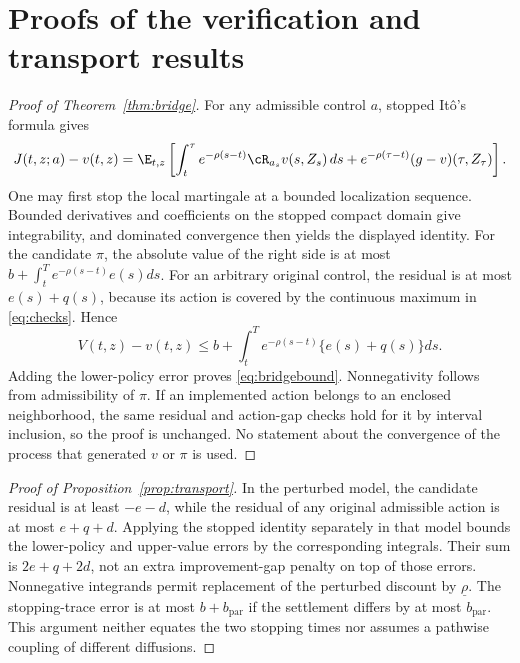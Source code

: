 \section{Proofs of the verification and transport results}\label{app:bridge}
\begin{proof}[Proof of Theorem~\ref{thm:bridge}]
For any admissible control $a$, stopped It\^o's formula gives
\begin{align*}
 J(t,z;a)-v(t,z)
 =\E_{t,z}\left[\int_t^\tau e^{-\rho(s-t)}\cR_{a_s}v(s,Z_s)\,ds
       +e^{-\rho(\tau-t)}(g-v)(\tau,Z_\tau)\right].
\end{align*}
One may first stop the local martingale at a bounded localization sequence. Bounded derivatives and coefficients on the stopped compact domain give integrability, and dominated convergence then yields the displayed identity. For the candidate $\pi$, the absolute value of the right side is at most
$b+\int_t^T e^{-\rho(s-t)}e(s)ds$.
For an arbitrary original control, the residual is at most $e(s)+q(s)$, because its action is covered by the continuous maximum in \eqref{eq:checks}. Hence
\[
 V(t,z)-v(t,z)\leq b+\int_t^T e^{-\rho(s-t)}\{e(s)+q(s)\}ds.
\]
Adding the lower-policy error proves \eqref{eq:bridgebound}. Nonnegativity follows from admissibility of $\pi$. If an implemented action belongs to an enclosed neighborhood, the same residual and action-gap checks hold for it by interval inclusion, so the proof is unchanged. No statement about the convergence of the process that generated $v$ or $\pi$ is used.
\end{proof}

\begin{proof}[Proof of Proposition~\ref{prop:transport}]
In the perturbed model, the candidate residual is at least $-e-d$, while the residual of any original admissible action is at most $e+q+d$. Applying the stopped identity separately in that model bounds the lower-policy and upper-value errors by the corresponding integrals. Their sum is $2e+q+2d$, not an extra improvement-gap penalty on top of those errors. Nonnegative integrands permit replacement of the perturbed discount by $\underline\rho$. The stopping-trace error is at most $b+b_\mathrm{par}$ if the settlement differs by at most $b_\mathrm{par}$. This argument neither equates the two stopping times nor assumes a pathwise coupling of different diffusions.
\end{proof}


